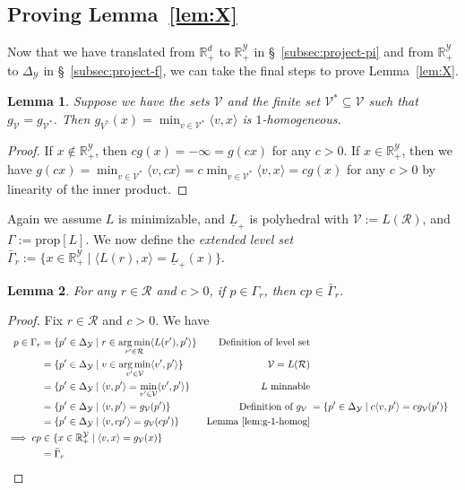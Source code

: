 \documentclass[11pt]{article}
\newcommand{\reals}{\mathbb{R}}
\newcommand{\prop}[1]{\mathrm{prop}[#1]}
\newcommand{\simplex}{\Delta_\Y}
\newcommand{\R}{\mathcal{R}}
\newcommand{\V}{\mathcal{V}}
\newcommand{\Y}{\mathcal{Y}}
\newcommand{\risk}[1]{\underline{#1}}
\newcommand{\inprod}[2]{\langle #1, #2 \rangle}%
\DeclareMathOperator*{\argmin}{arg\,min}
\newtheorem{lemma}{Lemma}
\begin{document}
\subsection{Proving Lemma~\ref{lem:X}}\label{subsec:lem-X-proof}
Now that we have translated from $\reals^d_+$ to $\reals^\Y_+$ in \S~\ref{subsec:project-pi} and from $\reals^\Y_+$ to $\simplex$ in \S~\ref{subsec:project-f}, we can take the final steps to prove Lemma~\ref{lem:X}.
\begin{lemma}\label{lem:g-1-homog}
	Suppose we have the sets $\V$ and the finite set $\V^* \subseteq \V$ such that $g_\V = g_{\V^*}$.
	Then $g_{V^*}(x) = \min_{v \in \V^*}\inprod{v}{x}$ is $1$-homogeneous.
\end{lemma}
\begin{proof}
	If $x \not \in \reals^\Y_+$, then $c g(x) = -\infty = g(cx)$ for any $c > 0$.
	If $x \in \reals^\Y_+$, then we have $g(cx) = \min_{v \in \V^*}\inprod{v}{cx} = c \min_{v \in \V^*}\inprod{v}{x} = c g(x)$ for any $c > 0$ by linearity of the inner product.
\end{proof}


Again we assume $L$ is minimizable, and $\risk L_+$ is polyhedral with $\V := L(\R)$, and $\Gamma := \prop{L}$.
We now define the \emph{extended level set} $\bar \Gamma_r := \{x \in \reals^\Y_+ \mid \inprod{L(r)}{x} = \risk L_+(x)\}$.

\begin{lemma}\label{lem:levelset-to-extended-levelset}
	For any $r \in \R$ and $c > 0$, if $p \in \Gamma_r$, then $cp \in \bar \Gamma_r$. 
\end{lemma}
\begin{proof}
	Fix $r \in \R$ and $c > 0$.
	We have
	\begin{align*}
	p \in \Gamma_r
	&= \{p' \in \simplex \mid r \in \argmin_{r' \in \R} \inprod{L(r')}{p'} \} & \text {Definition of level set} \\
	&= \{p' \in \simplex \mid v \in \argmin_{v' \in \V} \inprod{v'}{p'} \} & \text {$\V = L(\R)$} \\
	&= \{p' \in \simplex \mid \inprod{v}{p'} = \min_{v' \in \V} \inprod{v'}{p'} \} & \text {$L$ minnable} \\
	&= \{p' \in \simplex \mid \inprod{v}{p'} = g_\V(p') \} & \text {Definition of $g_\V$} \
	&= \{p' \in \simplex \mid c \inprod{v}{p'} = c g_\V(p') \} &  \\
	&= \{p' \in \simplex \mid  \inprod{v}{cp'} = g_\V(cp') \} & \text {Lemma~\ref{lem:g-1-homog}} \\
	\implies cp
	&\in \{x \in \reals^\Y_+ \mid \inprod{v}{x} = g_\V(x)\}\\
	&= \bar \Gamma_r
	\end{align*}
\end{proof}
\end{document}
